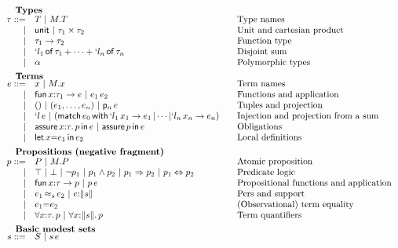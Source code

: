\begin{figure}
  \[
  \begin{array}{rl@{\qquad}l}
    \noalign{\textbf{Types}}
    \oty ::= 
    & \oTY  \obar \oselect{\oM}{\oTY} &\mbox{Type names}\\
    | & \ounit \obar \oprod{\oty_1}{\oty_2} &\mbox{Unit and cartesian product}\\
    | & \oarrow{\oty_1}{\oty_2} & \mbox{Function type}\\
    | & \osumty{\ol_1}{\oty_1}{\ol_n}{\oty_n} &\mbox{Disjoint sum}\\
    | & \opty & \mbox{Polymorphic types}\\[5pt]
    
    \noalign{\textbf{Terms}}	
    \oe ::=
    & \ox \obar \oselect{\oM}{\ox} &\mbox{Term names}\\
    | & \olambda{\ox}{\oty_1}{\oe} \obar 
    \oapp{\oe_1}{\oe_2} &\mbox{Functions and application}\\
    | & ()
    \obar \otuple{\oe_1}{\oe_n} 
    \obar \oproj{\oe}{n}&\mbox{Tuples and projection}\\
    | & \oinj{\ol}{\oe} 
    \obar (\omatches{\oe_0}{\ol_1}{\ox_1}{\oe_1}{\ol_n}{\ox_n}{\oe_n})&\mbox{Injection and projection from a sum}\\
    | & \ooblig{\ox}{\oty}{\op}{\oe} \obar \oobligx{\op}{\oe} &\mbox{Obligations}\\
    | & \olet{\ox}{\oe_1}{\oe_2}&\mbox{Local definitions}\\[5pt]
    

    \noalign{\textbf{Propositions (negative fragment)}}
    \op ::= 
    & \oP \obar \oselect{\oM}{\oP}&\mbox{Atomic
      proposition}\\
    | & \otrue  \obar \ofalse \obar \onot{\op_1} \obar \oand{\op_1}{\op_2} \obar 
    \oimply{\op_1}{\op_2} \obar \oiff{\op_1}{\op_2} & \mbox{Predicate logic}\\
    | & \olambda{\ox}{\oty}{\op}  \obar \oapp{\op}{\oe} &
    \mbox{Propositional functions and application}\\
    | & \oper{\os}{\oe_1}{\oe_2} \obar \ototal{\oe}{\os} & \mbox{Pers and support} \\
    | & \oequal{\oe_1}{\oe_2} & \mbox{(Observational) term equality}\\
    | & \oforall{\ox}{\oty}{\op}  \obar 
    \oforallt{\ox}{\os}{\op} & \mbox{Term quantifiers}\\[5pt]
    
    \noalign{\textbf{Basic modest sets}}
    \os ::=
    & \oS \obar \oapp{\os}{\oe} & \\[5pt]


\end{array}\]
\end{figure}
